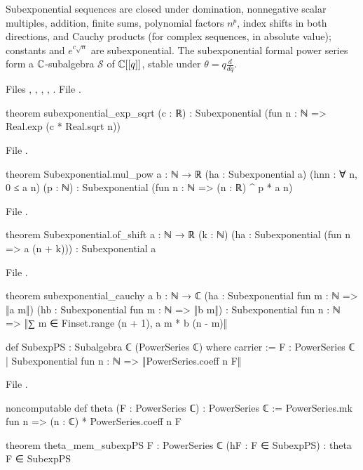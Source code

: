 \begin{theorem}\label{l14:thm:subexpclosure}
Subexponential sequences are closed under domination, nonnegative scalar multiples, addition, finite sums, polynomial factors
$n^p$, index shifts in both directions, and Cauchy products (for complex sequences, in absolute value); constants and
$e^{c\sqrt n}$ are subexponential. The subexponential formal power series form a ${\mathbb{C}}$-subalgebra $\mathcal S$ of ${\mathbb{C}}[[q]]$,
stable under $\theta = q\frac{d}{dq}$.
\end{theorem}
\noindent Files , ,
, , . File
.
\begin{leancode}
theorem subexponential_exp_sqrt (c : ℝ) :
    Subexponential (fun n : ℕ => Real.exp (c * Real.sqrt n))
\end{leancode}
\noindent File .
\begin{leancode}
theorem Subexponential.mul_pow {a : ℕ → ℝ} (ha : Subexponential a) (hnn : ∀ n, 0 ≤ a n) (p : ℕ) :
    Subexponential (fun n : ℕ => (n : ℝ) ^ p * a n)
\end{leancode}
\noindent File .
\begin{leancode}
theorem Subexponential.of_shift {a : ℕ → ℝ} (k : ℕ)
    (ha : Subexponential (fun n => a (n + k))) : Subexponential a
\end{leancode}
\noindent File .
\begin{leancode}
theorem subexponential_cauchy {a b : ℕ → ℂ}
    (ha : Subexponential fun m : ℕ => ‖a m‖) (hb : Subexponential fun m : ℕ => ‖b m‖) :
    Subexponential fun n : ℕ => ‖∑ m ∈ Finset.range (n + 1), a m * b (n - m)‖

def SubexpPS : Subalgebra ℂ (PowerSeries ℂ) where
  carrier := {F : PowerSeries ℂ | Subexponential fun n : ℕ => ‖PowerSeries.coeff n F‖}
\end{leancode}
\noindent File .
\begin{leancode}
noncomputable def theta (F : PowerSeries ℂ) : PowerSeries ℂ :=
  PowerSeries.mk fun n => (n : ℂ) * PowerSeries.coeff n F

theorem theta_mem_subexpPS {F : PowerSeries ℂ} (hF : F ∈ SubexpPS) : theta F ∈ SubexpPS
\end{leancode}
